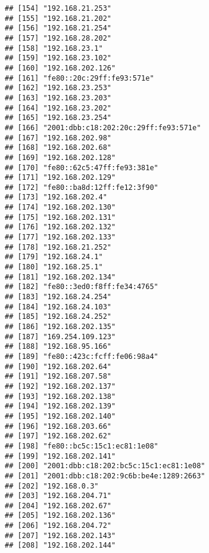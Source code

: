 \documentclass[
]{article}
\begin{document}
\begin{verbatim}
## [154] "192.168.21.253"                      
## [155] "192.168.21.202"                      
## [156] "192.168.21.254"                      
## [157] "192.168.28.202"                      
## [158] "192.168.23.1"                        
## [159] "192.168.23.102"                      
## [160] "192.168.202.126"                     
## [161] "fe80::20c:29ff:fe93:571e"            
## [162] "192.168.23.253"                      
## [163] "192.168.23.203"                      
## [164] "192.168.23.202"                      
## [165] "192.168.23.254"                      
## [166] "2001:dbb:c18:202:20c:29ff:fe93:571e" 
## [167] "192.168.202.98"                      
## [168] "192.168.202.68"                      
## [169] "192.168.202.128"                     
## [170] "fe80::62c5:47ff:fe93:381e"           
## [171] "192.168.202.129"                     
## [172] "fe80::ba8d:12ff:fe12:3f90"           
## [173] "192.168.202.4"                       
## [174] "192.168.202.130"                     
## [175] "192.168.202.131"                     
## [176] "192.168.202.132"                     
## [177] "192.168.202.133"                     
## [178] "192.168.21.252"                      
## [179] "192.168.24.1"                        
## [180] "192.168.25.1"                        
## [181] "192.168.202.134"                     
## [182] "fe80::3ed0:f8ff:fe34:4765"           
## [183] "192.168.24.254"                      
## [184] "192.168.24.103"                      
## [185] "192.168.24.252"                      
## [186] "192.168.202.135"                     
## [187] "169.254.109.123"                     
## [188] "192.168.95.166"                      
## [189] "fe80::423c:fcff:fe06:98a4"           
## [190] "192.168.202.64"                      
## [191] "192.168.207.58"                      
## [192] "192.168.202.137"                     
## [193] "192.168.202.138"                     
## [194] "192.168.202.139"                     
## [195] "192.168.202.140"                     
## [196] "192.168.203.66"                      
## [197] "192.168.202.62"                      
## [198] "fe80::bc5c:15c1:ec81:1e08"           
## [199] "192.168.202.141"                     
## [200] "2001:dbb:c18:202:bc5c:15c1:ec81:1e08"
## [201] "2001:dbb:c18:202:9c6b:be4e:1289:2663"
## [202] "192.168.0.3"                         
## [203] "192.168.204.71"                      
## [204] "192.168.202.67"                      
## [205] "192.168.202.136"                     
## [206] "192.168.204.72"                      
## [207] "192.168.202.143"                     
## [208] "192.168.202.144"                     

\end{verbatim}
\end{document}
